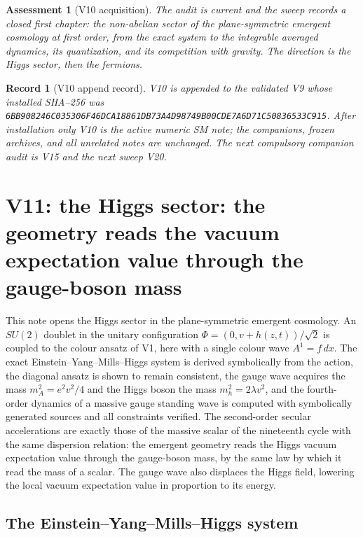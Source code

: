 \documentclass[11pt]{article}
\newtheorem{assessment}[theorem]{Assessment}
\newtheorem{record}[theorem]{Record}
\theoremstyle{remark}
\begin{document}
\begin{assessment}[V10 acquisition]
\label{ass:v20v10}
The audit is current and the sweep records a closed first chapter:
the non-abelian sector of the plane-symmetric emergent cosmology at
first order, from the exact system to the integrable averaged
dynamics, its quantization, and its competition with gravity.  The
direction is the Higgs sector, then the fermions.
\end{assessment}

\begin{record}[V10 append record]
\label{rec:v20v10}
V10 is appended to the validated V9 whose installed SHA--256 was
\texttt{6BB908246C035306F46DCA18861DB73A4D98749B00CDE7A6D71C50836533C915}.
After installation only V10 is the active numeric SM note; the
companions, frozen archives, and all unrelated notes are unchanged.
The next compulsory companion audit is V15 and the next sweep V20.
\end{record}


\section{V11: the Higgs sector: the geometry reads the vacuum expectation value through the gauge-boson mass}
\label{sec:v20v11}

This note opens the Higgs sector in the plane-symmetric emergent
cosmology.  An \(SU(2)\) doublet in the unitary configuration
\(\Phi=(0,v+h(z,t))/\sqrt2\) is coupled to the colour ansatz of V1,
here with a single colour wave \(A^1=f\,dx\).  The exact
Einstein--Yang--Mills--Higgs system is derived symbolically from the
action, the diagonal ansatz is shown to remain consistent, the gauge
wave acquires the mass \(m_A^2=e^2v^2/4\) and the Higgs boson the
mass \(m_h^2=2\lambda v^2\), and the fourth-order dynamics of a
massive gauge standing wave is computed with symbolically generated
sources and all constraints verified.  The second-order secular
accelerations are exactly those of the massive scalar of the
nineteenth cycle with the same dispersion relation: the emergent
geometry reads the Higgs vacuum expectation value through the
gauge-boson mass, by the same law by which it read the mass of a
scalar.  The gauge wave also displaces the Higgs field, lowering the
local vacuum expectation value in proportion to its energy.

\subsection{The Einstein--Yang--Mills--Higgs system}
\end{document}
